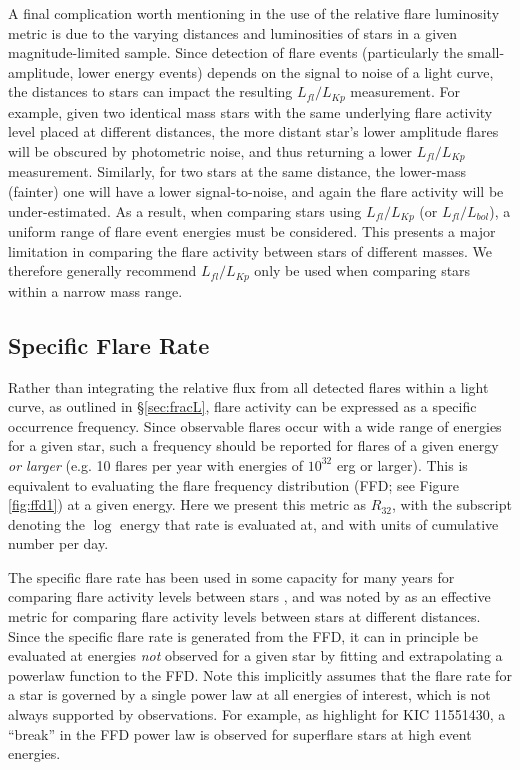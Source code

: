 \documentclass[preprint2]{aastex62}
\begin{document}
A final complication worth mentioning in the use of the relative flare luminosity metric is due to the varying distances and luminosities of stars in a given magnitude-limited sample. Since detection of flare events (particularly the small-amplitude, lower energy events) depends on the signal to noise of a light curve, the distances to stars can impact the resulting $L_{fl}/L_{Kp}$ measurement. 
For example, given two identical mass stars with the same underlying flare activity level placed at different distances, the more distant star's lower amplitude flares will be obscured by photometric noise, and thus returning a lower $L_{fl}/L_{Kp}$ measurement. Similarly, for two stars at the same distance, the lower-mass (fainter) one will have a lower signal-to-noise, and again the flare activity will be under-estimated. As a result, when comparing stars using $L_{fl}/L_{Kp}$ (or $L_{fl}/L_{bol}$), a uniform range of flare event energies must be considered. This presents a major limitation in comparing the flare activity between stars of different masses. We therefore generally recommend $L_{fl}/L_{Kp}$ only be used when comparing stars within a narrow mass range.





\subsection{Specific Flare Rate}
\label{sec:rate}

Rather than integrating the relative flux from all detected flares within a light curve, as outlined in \S\ref{sec:fracL}, flare activity can be expressed as a specific occurrence frequency. Since observable flares occur with a wide range of energies for a given star, such a frequency should be reported for flares of a given energy {\it or larger} (e.g. 10 flares per year with energies of $10^{32}$ erg or larger). This is equivalent to evaluating the flare frequency distribution (FFD; see Figure \ref{fig:ffd1}) at a given energy. Here we present this metric as $R_{32}$, with the subscript denoting the $\log$ energy that rate is evaluated at, and with units of cumulative number per day.

The specific flare rate has been used in some capacity for many years for comparing flare activity levels between stars \citep[e.g.][]{lme1976}, and was noted by \citet{davenport2016} as an effective metric for comparing flare activity levels between stars at different distances. Since the specific flare rate is generated from the FFD, it can in principle be evaluated at energies {\it not} observed for a given star by fitting and extrapolating a powerlaw function to the FFD. Note this implicitly assumes that the flare rate for a star is governed by a single power law at all energies of interest, which is not always supported by observations. For example, as \citet{davenport2016} highlight for KIC 11551430, a ``break'' in the FFD power law is observed for superflare stars at high event energies. 
\end{document}
